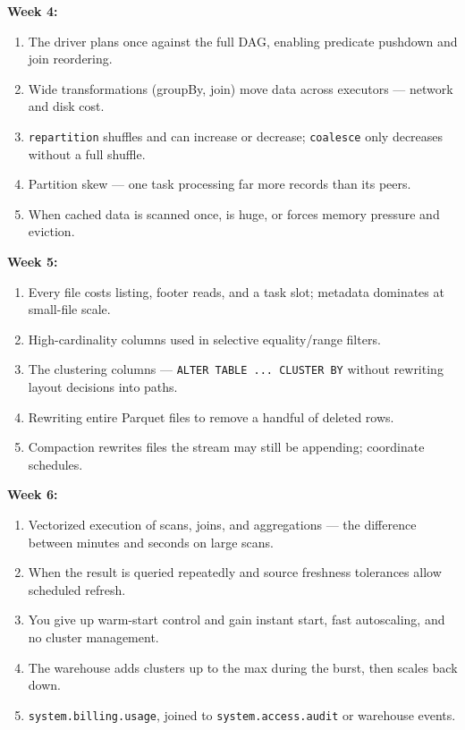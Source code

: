 \documentclass[11pt, a4paper]{article}
\begin{document}
\noindent\textbf{Week 4:}
\begin{enumerate}[itemsep=0pt, leftmargin=2em]
    \item The driver plans once against the full DAG, enabling predicate pushdown and join reordering.
    \item Wide transformations (groupBy, join) move data across executors --- network and disk cost.
    \item \texttt{repartition} shuffles and can increase or decrease; \texttt{coalesce} only decreases without a full shuffle.
    \item Partition skew --- one task processing far more records than its peers.
    \item When cached data is scanned once, is huge, or forces memory pressure and eviction.
\end{enumerate}
\noindent\textbf{Week 5:}
\begin{enumerate}[itemsep=0pt, leftmargin=2em]
    \item Every file costs listing, footer reads, and a task slot; metadata dominates at small-file scale.
    \item High-cardinality columns used in selective equality/range filters.
    \item The clustering columns --- \texttt{ALTER TABLE ... CLUSTER BY} without rewriting layout decisions into paths.
    \item Rewriting entire Parquet files to remove a handful of deleted rows.
    \item Compaction rewrites files the stream may still be appending; coordinate schedules.
\end{enumerate}
\noindent\textbf{Week 6:}
\begin{enumerate}[itemsep=0pt, leftmargin=2em]
    \item Vectorized execution of scans, joins, and aggregations --- the difference between minutes and seconds on large scans.
    \item When the result is queried repeatedly and source freshness tolerances allow scheduled refresh.
    \item You give up warm-start control and gain instant start, fast autoscaling, and no cluster management.
    \item The warehouse adds clusters up to the max during the burst, then scales back down.
    \item \texttt{system.billing.usage}, joined to \texttt{system.access.audit} or warehouse events.
\end{enumerate}
\end{document}
